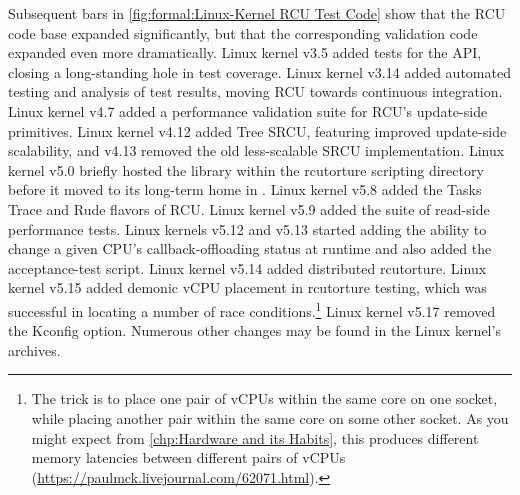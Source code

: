 Subsequent bars in \cref{fig:formal:Linux-Kernel RCU Test Code} show
that the RCU code base expanded significantly, but that the
corresponding validation code expanded even more dramatically.
Linux kernel v3.5 added tests for the  API, closing
a long-standing hole in test coverage.
Linux kernel v3.14 added automated testing and analysis of test results,
moving RCU towards continuous integration.
Linux kernel v4.7 added a performance validation suite for RCU's update-side
primitives.
Linux kernel v4.12 added Tree SRCU, featuring improved update-side
scalability, and v4.13 removed the old less-scalable SRCU implementation.
Linux kernel v5.0 briefly hosted the  library within
the rcutorture scripting directory before it moved to its long-term
home in .
Linux kernel v5.8 added the Tasks Trace and Rude flavors of RCU\@.
Linux kernel v5.9 added the  suite of read-side performance
tests.
Linux kernels v5.12 and v5.13 started adding the ability to change a
given CPU's callback-offloading status at runtime and also added the
 acceptance-test script.
Linux kernel v5.14 added distributed rcutorture.
Linux kernel v5.15 added demonic vCPU placement in rcutorture testing,
which was successful in locating a number of race conditions.\footnote{
	The trick is to place one pair of vCPUs within the same core on
	one socket, while placing another pair within the same core on
	some other socket.
	As you might expect from \cref{chp:Hardware and its Habits},
	this produces different memory latencies between different
	pairs of vCPUs
	(\url{https://paulmck.livejournal.com/62071.html}).}
Linux kernel v5.17 removed the  Kconfig option.
Numerous other changes may be found in the Linux kernel's  archives.

